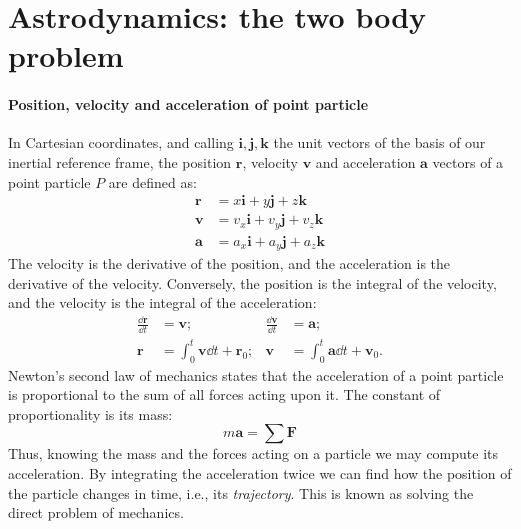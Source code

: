 \section[Astrodynamics]{Astrodynamics: the two body problem}

\paragraph{Position, velocity and acceleration of point particle}

In Cartesian coordinates, and calling $\bm i,\bm j, \bm k$ the unit vectors
of the basis of our inertial reference frame, the position $\bm r$, velocity 
$\bm v$ and acceleration $\bm a$ vectors of a point particle $P$ are defined 
as:
%
\begin{align}
\bm r &= x\bm i + y \bm j + z \bm k
\\
\bm v &= v_x\bm i + v_y \bm j + v_z \bm k
\\
\bm a &= a_x\bm i + a_y \bm j + a_z \bm k
\end{align}
%
The velocity is the derivative of the position, and the acceleration is the 
derivative of the velocity. Conversely, the position is the integral of the 
velocity, and the velocity is the integral of the acceleration:
%
\begin{align}
\frac{\dd \bm r}{\dd t} &= \bm v;
&\frac{\dd \bm v}{\dd t} &= \bm a;
\\
\bm r &= \int_0^t \bm v \dd t + \bm r_0;
&\bm v &= \int_0^t \bm a \dd t + \bm v_0.
\end{align}
%
Newton's second law of mechanics states that the 
acceleration of a point particle is proportional to the 
sum of all forces acting upon it. The constant of proportionality is its mass:
%
\begin{equation}
m\bm a = \sum \bm F
\end{equation}
%
Thus, knowing the mass and the forces acting on a particle we may compute its 
acceleration. By integrating the acceleration twice we can find how the 
position of the particle changes in time, i.e., its \emph{trajectory}. This
is known as solving the direct problem of mechanics.

